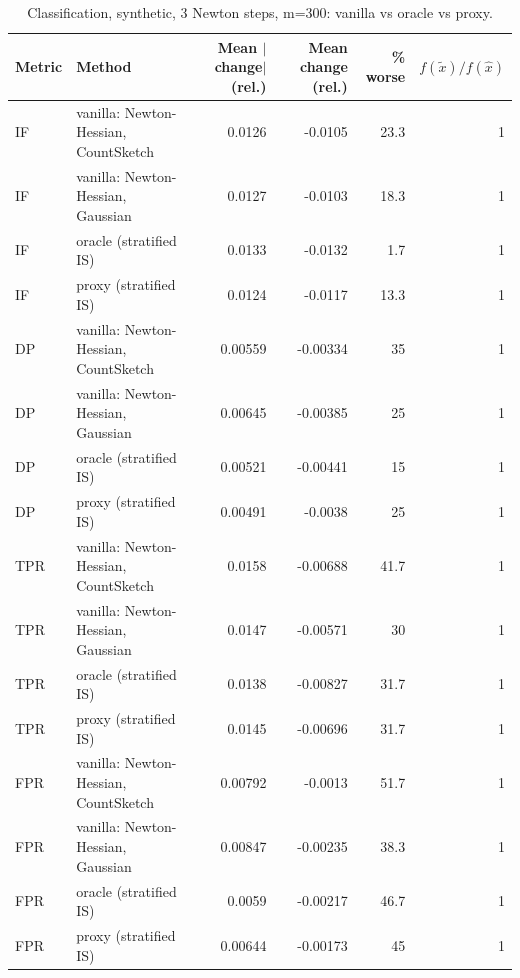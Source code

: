 \begin{table}[t]
\centering
\small
\begin{tabular}{llrrrr}
\toprule
Metric & Method & Mean $|$change$|$ (rel.) & Mean change (rel.) & \% worse & $f(\tilde x)/f(\hat x)$ \\
\midrule
IF & vanilla: Newton-Hessian, CountSketch & 0.0126 & -0.0105 & 23.3 & 1 \\
IF & vanilla: Newton-Hessian, Gaussian & 0.0127 & -0.0103 & 18.3 & 1 \\
IF & oracle (stratified IS) & 0.0133 & -0.0132 & 1.7 & 1 \\
IF & proxy (stratified IS) & 0.0124 & -0.0117 & 13.3 & 1 \\
\midrule
DP & vanilla: Newton-Hessian, CountSketch & 0.00559 & -0.00334 & 35 & 1 \\
DP & vanilla: Newton-Hessian, Gaussian & 0.00645 & -0.00385 & 25 & 1 \\
DP & oracle (stratified IS) & 0.00521 & -0.00441 & 15 & 1 \\
DP & proxy (stratified IS) & 0.00491 & -0.0038 & 25 & 1 \\
\midrule
TPR & vanilla: Newton-Hessian, CountSketch & 0.0158 & -0.00688 & 41.7 & 1 \\
TPR & vanilla: Newton-Hessian, Gaussian & 0.0147 & -0.00571 & 30 & 1 \\
TPR & oracle (stratified IS) & 0.0138 & -0.00827 & 31.7 & 1 \\
TPR & proxy (stratified IS) & 0.0145 & -0.00696 & 31.7 & 1 \\
\midrule
FPR & vanilla: Newton-Hessian, CountSketch & 0.00792 & -0.0013 & 51.7 & 1 \\
FPR & vanilla: Newton-Hessian, Gaussian & 0.00847 & -0.00235 & 38.3 & 1 \\
FPR & oracle (stratified IS) & 0.0059 & -0.00217 & 46.7 & 1 \\
FPR & proxy (stratified IS) & 0.00644 & -0.00173 & 45 & 1 \\
\bottomrule
\end{tabular}
\caption{Classification, synthetic, 3 Newton steps, m=300: vanilla vs oracle vs proxy.}
\label{tab:s5c_synth_table}
\end{table}